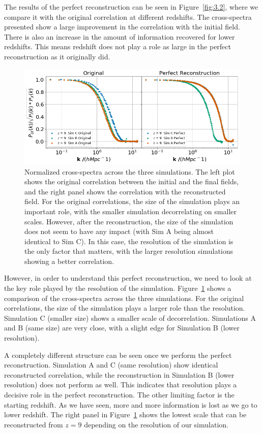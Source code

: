 The results of the perfect reconstruction can be seen in Figure~\ref{fig:3.2}, where we compare it with the original correlation at different redshifts. The cross-spectra presented show a large improvement in the correlation with the initial field. There is also an increase in the amount of information recovered for lower redshifts. This means redshift does not play a role as large in the perfect reconstruction as it originally did. 

\begin{figure}
    \centering
    \includegraphics[width=1\columnwidth]{images/perfRecon/simComp.png}%
    
    \caption{
    Normalized cross-spectra across the three simulations. The left plot shows the original correlation between the initial and the final fields, and the right panel shows the correlation with the reconstructed field. For the original correlations, the size of the simulation plays an important role, with the smaller simulation decorrelating on smaller scales. However, after the reconstruction, the size of the simulation does not seem to have any impact (with Sim A being almost identical to Sim C). In this case, the resolution of the simulation is the only factor that matters, with the larger resolution simulations showing a better correlation.
    }
    
    \label{fig:3.3}
\end{figure}
However, in order to understand this perfect reconstruction, we need to look at the key role played by the resolution of the simulation. Figure~\ref{fig:3.3} shows a comparison of the cross-spectra across the three simulations. For the original correlations, the size of the simulation plays a larger role than the resolution. Simulation C (smaller size) shows a smaller scale of decorrelation. Simulations A and B (same size) are very close, with a slight edge for Simulation B (lower resolution). 

A completely different structure can be seen once we perform the perfect reconstruction. Simulation A and C (same resolution) show identical reconstructed correlation, while the reconstruction in Simulation B (lower resolution) does not perform as well. This indicates that resolution plays a decisive role in the perfect reconstruction. The other limiting factor is the starting redshift. As we have seen, more and more information is lost as we go to lower redshift. The right panel in Figure~\ref{fig:3.3} shows the lowest scale that can be reconstructed from $z=9$ depending on the resolution of our simulation.

